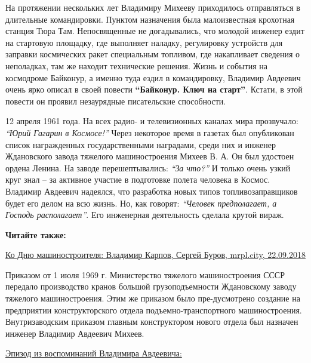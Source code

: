 На протяжении нескольких лет Владимиру Михееву приходилось отправляться в
длительные командировки. Пунктом назначения была малоизвестная крохотная
станция Тюра Там. Непосвященные не догадывались, что молодой инженер ездит на
стартовую площадку, где выполняет наладку, регулировку устройств для заправки
космических ракет специальным топливом, где накапливает сведения о неполадках,
там же находит технические решения. Жизнь и события на космодроме Байконур, а
именно туда ездил в командировку, Владимир Авдеевич очень ярко описал в своей
повести \textbf{\enquote{Байконур. Ключ на старт}}. Кстати, в этой повести он проявил
незаурядные писательские способности.

12 апреля 1961 года. На всех радио- и телевизионных каналах мира прозвучало:
\emph{\enquote{Юрий Гагарин в Космосе!}} Через некоторое время в газетах был опубликован
список награжденных государственными наградами, среди них и инженер Ждановского
завода тяжелого машиностроения Михеев В. А. Он был удостоен ордена Ленина. На
заводе перешептывались: \emph{\enquote{За что?}} И только очень узкий круг знал – за активное
участие в подготовке полета человека в Космос. Владимир Авдеевич надеялся, что
разработка новых типов топливозаправщиков будет его делом на всю жизнь. Но, как
говорят: \emph{\enquote{Человек предполагает, а Господь располагает}}. Его инженерная
деятельность сделала крутой вираж. 

\textbf{Читайте также:} 

\href{https://archive.org/details/22_09_2018.sergij_burov.mrpl_city.ko_dnju_mashinostroenia_vladimir_karpov}{%
Ко Дню машиностроителя: Владимир Карпов, Сергей Буров, mrpl.city, 22.09.2018}

Приказом от 1 июля 1969 г. Министерство тяжелого машиностроения СССР передало
производство кранов большой грузоподъемности Ждановскому заводу тяжелого
машиностроения. Этим же приказом было пре\hyp{}дусмотрено создание на предприятии
конструкторского отдела подъемно-транспортного машиностроения. Внутризаводским
приказом главным конструктором нового отдела был назначен инженер Владимир
Авдеевич Михеев.

\underline{Эпизод из воспоминаний Владимира Авдеевича:}

